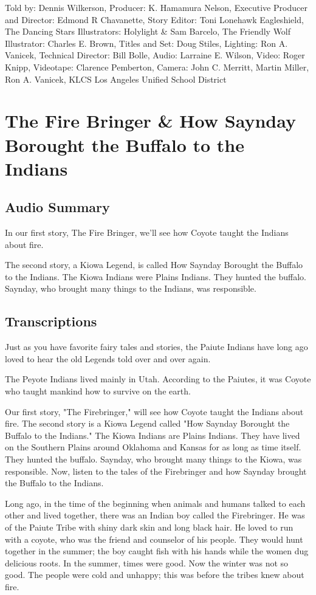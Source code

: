 Told by: Dennis Wilkerson,
Producer: K. Hamamura Nelson,
Executive Producer and Director: Edmond R Chavanette,
Story Editor: Toni Lonehawk Eagleshield,
The Dancing Stars Illustrators: Holylight \& Sam Barcelo,
The Friendly Wolf Illustrator: Charles E. Brown,
Titles and Set: Doug Stiles,
Lighting: Ron A. Vanicek,
Technical Director: Bill Bolle,
Audio: Larraine E. Wilson,
Video: Roger Knipp,
Videotape: Clarence Pemberton,
Camera: John C. Merritt, Martin Miller, Ron A. Vanicek,
KLCS Los Angeles Unified School District

\section{The Fire Bringer \& How Saynday Borought the Buffalo to the Indians}

\subsection{Audio Summary}

In our first story, The Fire Bringer, we'll see how Coyote taught the Indians about fire.

The second story, a Kiowa Legend, is called How Saynday Borought the Buffalo to the Indians. The Kiowa Indians were Plains Indians.
They hunted the buffalo.
Saynday, who brought many things to the Indians, was responsible.

\subsection{Transcriptions}

Just as you have favorite fairy tales and stories, the Paiute Indians have long ago loved to hear the old Legends told over and over again.

The Peyote Indians lived mainly in Utah. According to the Paiutes, it was Coyote who taught mankind how to survive on the earth.

Our first story, "The Firebringer," will see how Coyote taught the Indians about fire. The second story is a Kiowa Legend called "How Saynday Borought the Buffalo to the Indians." The Kiowa Indians are Plains Indians. They have lived on the Southern Plains around Oklahoma and Kansas for as long as time itself. They hunted the buffalo. Saynday, who brought many things to the Kiowa, was responsible. Now, listen to the tales of the Firebringer and how Saynday brought the Buffalo to the Indians.

Long ago, in the time of the beginning when animals and humans talked to each other and lived together, there was an Indian boy called the Firebringer. He was of the Paiute Tribe with shiny dark skin and long black hair. He loved to run with a coyote, who was the friend and counselor of his people. They would hunt together in the summer; the boy caught fish with his hands while the women dug delicious roots. In the summer, times were good. Now the winter was not so good. The people were cold and unhappy; this was before the tribes knew about fire.

